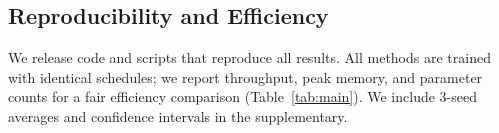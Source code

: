\subsection*{Reproducibility and Efficiency}
We release code and scripts that reproduce all results. All methods are trained with identical schedules; we report throughput, peak memory, and parameter counts for a fair efficiency comparison (Table~\ref{tab:main}). We include 3-seed averages and confidence intervals in the supplementary.
